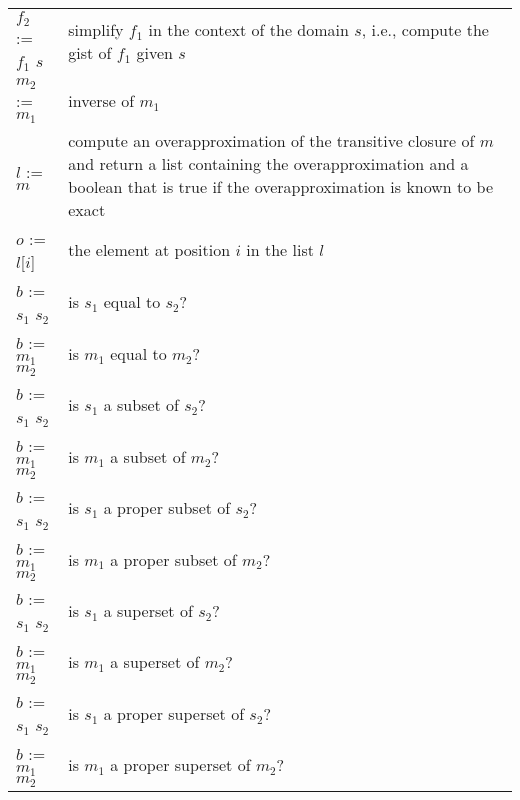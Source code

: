 \begin{supertabular}{lp{0.7\textwidth}}
$f_2$ := $f_1$ \ai[\tt]{\%} $s$ &
simplify $f_1$ in the context of the domain $s$, i.e., compute
the gist of $f_1$ given $s$
\\
$m_2$ := $m_1$ & inverse of $m_1$
\\
$l$ := $m$\ai[\tt]{\^{}+} &
compute an overapproximation of the transitive closure
of $m$ and return a list containing the overapproximation
and a boolean that is true if the overapproximation
is known to be exact
\\
$o$ := $l$[$i$] &
the element at position $i$ in the list $l$
\\
$b$ := $s_1$ \ai[\tt]{=} $s_2$ & is $s_1$ equal to $s_2$?
\\
$b$ := $m_1$ \ai[\tt]{=} $m_2$ & is $m_1$ equal to $m_2$?
\\
$b$ := $s_1$ \ai[\tt]{<=} $s_2$ & is $s_1$ a subset of $s_2$?
\\
$b$ := $m_1$ \ai[\tt]{<=} $m_2$ & is $m_1$ a subset of $m_2$?
\\
$b$ := $s_1$ \ai[\tt]{<} $s_2$ & is $s_1$ a proper subset of $s_2$?
\\
$b$ := $m_1$ \ai[\tt]{<} $m_2$ & is $m_1$ a proper subset of $m_2$?
\\
$b$ := $s_1$ \ai[\tt]{>=} $s_2$ & is $s_1$ a superset of $s_2$?
\\
$b$ := $m_1$ \ai[\tt]{>=} $m_2$ & is $m_1$ a superset of $m_2$?
\\
$b$ := $s_1$ \ai[\tt]{>} $s_2$ & is $s_1$ a proper superset of $s_2$?
\\
$b$ := $m_1$ \ai[\tt]{>} $m_2$ & is $m_1$ a proper superset of $m_2$?
\\
\end{supertabular}
